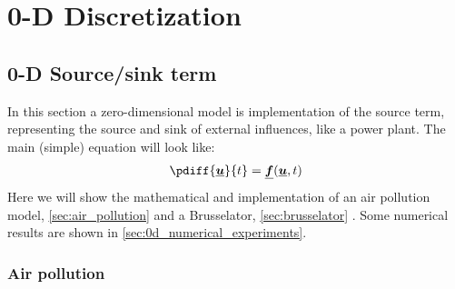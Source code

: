 \chapter{0-D Discretization}\label{sec:0d_discretization}
\section{0-D Source/sink term }\label{sec:0d_source_and_sink}
In this section a zero-dimensional model is implementation of the source term, representing the source and sink of external influences, like a power plant.
The main (simple) equation will look like:
\begin{align}
    \pdiff{\vec{u}}{t} = \vec{f}(\vec{u},t)
\end{align}
Here we will show the mathematical and implementation of an air pollution model, \autoref{sec:air_pollution} \citep[ex.\ 1.1 pg.\ 7]{HundsdorferAndVerwer2003} and a Brusselator, \autoref{sec:brusselator}  \citep{AultHolmgreen2003}.
Some numerical results are shown in \autoref{sec:0d_numerical_experiments}.
\subsection{Air pollution}\label{sec:air_pollution}
